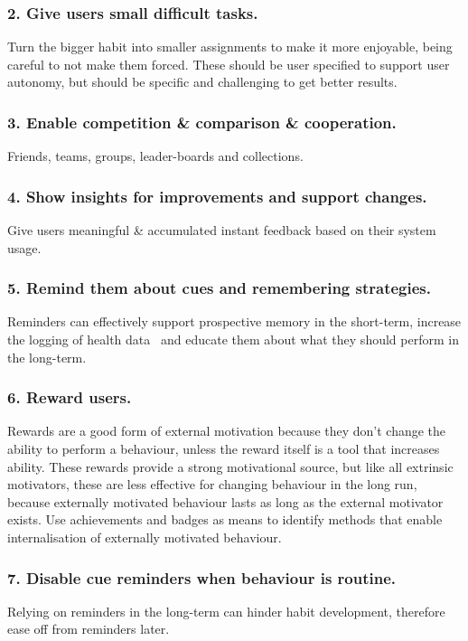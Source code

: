 \documentclass{scaffold/sigchi}
\begin{document}
\subsubsection*{2. Give users small difficult tasks.}
Turn the bigger habit into smaller assignments to make it more enjoyable, being careful to not make them forced. These should be user specified to support user autonomy, but should be specific and challenging to get better results.

\subsubsection*{3. Enable competition \& comparison \& cooperation.}
Friends, teams, groups, leader-boards and collections.

\subsubsection*{4. Show insights for improvements and support changes.}
Give users meaningful \& accumulated  instant feedback based on their system usage.

\subsubsection*{5. Remind them about cues and remembering strategies.}
Reminders can effectively support prospective memory in the short-term, increase the logging of health data~\cite{the_power_of_logging_mobile_notifications} and educate them about what they should perform in the long-term.

\subsubsection*{6. Reward users.}
Rewards are a good form of external motivation because they don't change the ability to perform a behaviour, unless the reward itself is a tool that increases ability. These rewards provide a strong motivational source, but like all extrinsic motivators, these are less effective for changing behaviour in the long run, because externally motivated behaviour lasts as long as the external motivator exists. Use achievements and badges as means to identify methods that enable internalisation of externally motivated behaviour.

\subsubsection*{7. Disable cue reminders when behaviour is routine.}
Relying on reminders in the long-term can hinder habit development, therefore ease off from reminders later.
\end{document}
